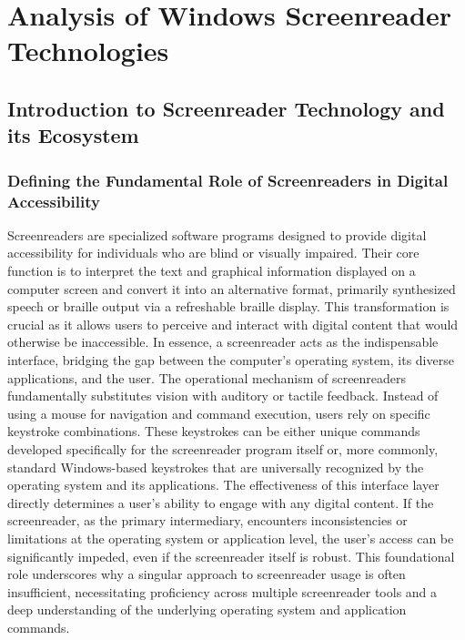 \chapter{Analysis of Windows Screenreader Technologies}

\section{Introduction to Screenreader Technology and its Ecosystem}

\subsection{Defining the Fundamental Role of Screenreaders in Digital Accessibility}
Screenreaders are specialized software programs designed to provide digital accessibility for individuals who are blind or visually impaired. Their core function is to interpret the text and graphical information displayed on a computer screen and convert it into an alternative format, primarily synthesized speech or braille output via a refreshable braille display.\supercite{kingsbury2025} This transformation is crucial as it allows users to perceive and interact with digital content that would otherwise be inaccessible. In essence, a screenreader acts as the indispensable interface, bridging the gap between the computer's operating system, its diverse applications, and the user.\supercite{kingsbury2025}
The operational mechanism of screenreaders fundamentally substitutes vision with auditory or tactile feedback. Instead of using a mouse for navigation and command execution, users rely on specific keystroke combinations. These keystrokes can be either unique commands developed specifically for the screenreader program itself or, more commonly, standard Windows-based keystrokes that are universally recognized by the operating system and its applications.\supercite{kingsbury2025} The effectiveness of this interface layer directly determines a user's ability to engage with any digital content. If the screenreader, as the primary intermediary, encounters inconsistencies or limitations at the operating system or application level, the user's access can be significantly impeded, even if the screenreader itself is robust. This foundational role underscores why a singular approach to screenreader usage is often insufficient, necessitating proficiency across multiple screenreader tools and a deep understanding of the underlying operating system and application commands.

